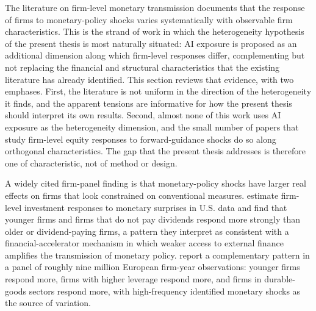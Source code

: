 The literature on firm-level monetary transmission documents that the
response of firms to monetary-policy shocks varies systematically with
observable firm characteristics. This is the strand of work in which
the heterogeneity hypothesis of the present thesis is most naturally
situated: AI exposure is proposed as an additional dimension along
which firm-level responses differ, complementing but not replacing the
financial and structural characteristics that the existing literature
has already identified. This section reviews that evidence, with two
emphases. First, the literature is not uniform in the direction of the
heterogeneity it finds, and the apparent tensions are informative for
how the present thesis should interpret its own results. Second, almost
none of this work uses AI exposure as the heterogeneity dimension, and
the small number of papers that study firm-level equity responses to
forward-guidance shocks do so along orthogonal characteristics. The
gap that the present thesis addresses is therefore one of
characteristic, not of method or design.

A widely cited firm-panel finding is that monetary-policy shocks have
larger real effects on firms that look constrained on conventional
measures.  estimate firm-level investment
responses to monetary surprises in U.S. data and find that younger
firms and firms that do not pay dividends respond more strongly than
older or dividend-paying firms, a pattern they interpret as consistent
with a financial-accelerator mechanism in which weaker access to
external finance amplifies the transmission of monetary policy.
 report a complementary pattern in a panel of
roughly nine million European firm-year observations: younger firms
respond more, firms with higher leverage respond more, and firms in
durable-goods sectors respond more, with high-frequency identified
monetary shocks as the source of variation.

